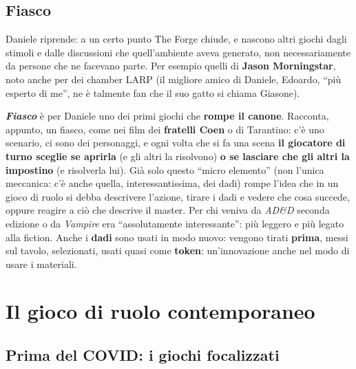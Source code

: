 \subsection{Fiasco}



Daniele riprende: a un certo punto The Forge chiude, e nascono altri giochi
dagli stimoli e dalle discussioni che quell'ambiente aveva generato, non
necessariamente da persone che ne facevano parte. Per esempio quelli di
\textbf{Jason Morningstar}, noto anche per dei chamber LARP (il migliore amico
di Daniele, Edoardo, ``più esperto di me'', ne è talmente fan che il suo gatto si
chiama Giasone).

\textbf{\emph{Fiasco}} è per Daniele uno dei primi giochi che \textbf{rompe il
canone}. Racconta, appunto, un fiasco, come nei film dei \textbf{fratelli Coen}
o di Tarantino: c'è uno scenario, ci sono dei personaggi, e ogni volta che si fa
una scena \textbf{il giocatore di turno sceglie se aprirla} (e gli altri la
risolvono) \textbf{o se lasciare che gli altri la impostino} (e risolverla lui).
Già solo questo ``micro elemento'' (non l'unica meccanica: c'è anche quella,
interessantissima, dei dadi) rompe l'idea che in un gioco di ruolo si debba
descrivere l'azione, tirare i dadi e vedere che cosa succede, oppure reagire a
ciò che descrive il master. Per chi veniva da \emph{AD\&D} seconda edizione o da
\emph{Vampire} era ``assolutamente interessante'': più leggero e più legato alla
fiction. Anche i \textbf{dadi} sono usati in modo nuovo: vengono tirati
\textbf{prima}, messi sul tavolo, selezionati, usati quasi come
\textbf{token}: un'innovazione anche nel modo di usare i materiali.

\section{Il gioco di ruolo contemporaneo}
\label{a2:sec:gdr-oggi}

\subsection{Prima del COVID: i giochi focalizzati}




